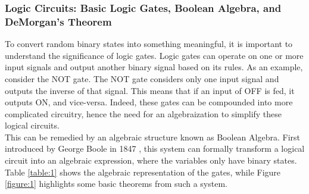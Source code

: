 \documentclass{report}
\begin{document}
	\subsubsection{Logic Circuits: Basic Logic Gates, Boolean Algebra, and DeMorgan's Theorem}
	To convert random binary states into something meaningful, it is important to understand the significance of logic gates. Logic gates can operate on one or more input signals and output another binary signal based on its rules. As an example, consider the NOT gate. The NOT gate considers only one input signal and outputs the inverse of that signal. This means that if an input of OFF is fed, it outputs ON, and vice-versa. Indeed, these gates can be compounded into more complicated circuitry, hence the need for an algebraization to simplify these logical circuits. \\
	
	This can be remedied by an algebraic structure known as Boolean Algebra. First introduced by George Boole in 1847 \autocite{booleLogicMathematicalAnalysis2015}, this system can formally transform a logical circuit into an algebraic expression, where the variables only have binary states. Table \ref{table:1} shows the algebraic representation of the gates, while Figure \ref{figure:1} highlights some basic theorems from such a system.
	
\end{document}

